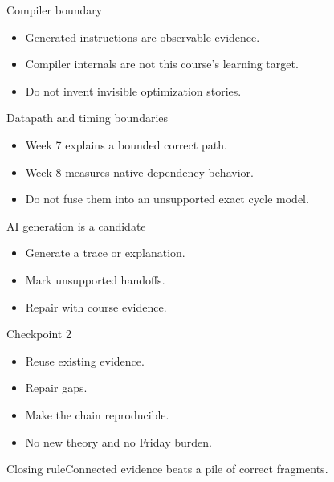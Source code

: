 \documentclass{beamer}
\begin{document}
\begin{frame}{Compiler boundary}\begin{itemize}\item Generated instructions are observable evidence.\item Compiler internals are not this course's learning target.\item Do not invent invisible optimization stories.\end{itemize}\end{frame}
\begin{frame}{Datapath and timing boundaries}\begin{itemize}\item Week 7 explains a bounded correct path.\item Week 8 measures native dependency behavior.\item Do not fuse them into an unsupported exact cycle model.\end{itemize}\end{frame}
\begin{frame}{AI generation is a candidate}\begin{itemize}\item Generate a trace or explanation.\item Mark unsupported handoffs.\item Repair with course evidence.\end{itemize}\end{frame}
\begin{frame}{Checkpoint 2}\begin{itemize}\item Reuse existing evidence.\item Repair gaps.\item Make the chain reproducible.\item No new theory and no Friday burden.\end{itemize}\end{frame}
\begin{frame}{Closing rule}\centering\Large Connected evidence beats a pile of correct fragments.\end{frame}
\end{document}
